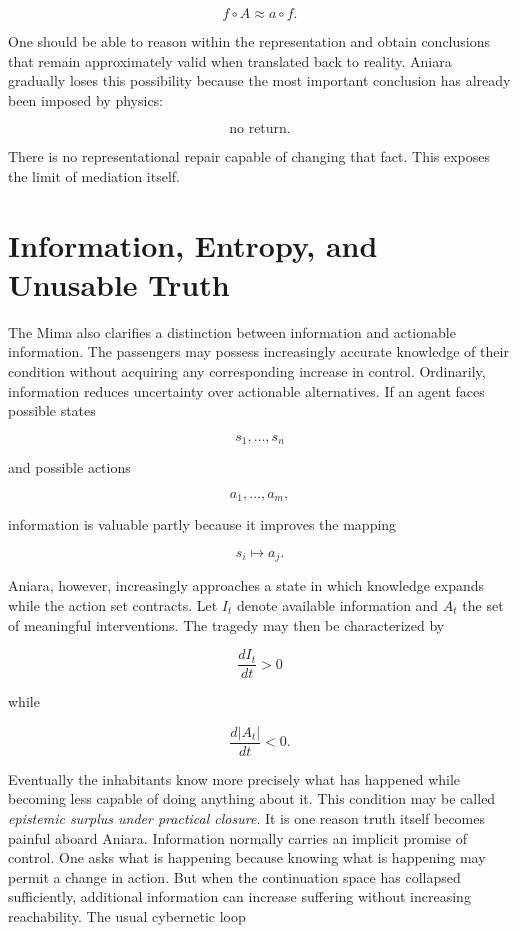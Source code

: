 \documentclass[11pt,oneside]{book}
\theoremstyle{definition}
\theoremstyle{remark}
\begin{document}
\[
f\circ A \approx a\circ f.
\]

One should be able to reason within the representation and obtain conclusions that remain
approximately valid when translated back to reality. Aniara gradually loses this possibility because
the most important conclusion has already been imposed by physics:

\[
\text{no return}.
\]

There is no representational repair capable of changing that fact. This exposes the limit of
mediation itself.

\section{Information, Entropy, and Unusable Truth}

The Mima also clarifies a distinction between information and actionable information. The passengers
may possess increasingly accurate knowledge of their condition without acquiring any corresponding
increase in control. Ordinarily, information reduces uncertainty over actionable alternatives. If an
agent faces possible states

\[
s_1,\ldots,s_n
\]

and possible actions

\[
a_1,\ldots,a_m,
\]

information is valuable partly because it improves the mapping

\[
s_i\mapsto a_j.
\]

Aniara, however, increasingly approaches a state in which knowledge expands while the action set
contracts. Let \(I_t\) denote available information and \(A_t\) the set of meaningful interventions.
The tragedy may then be characterized by

\[
\frac{dI_t}{dt}>0
\]

while

\[
\frac{d|A_t|}{dt}<0.
\]

Eventually the inhabitants know more precisely what has happened while becoming less capable of
doing anything about it. This condition may be called \emph{epistemic surplus under practical
closure}. It is one reason truth itself becomes painful aboard Aniara. Information normally carries
an implicit promise of control. One asks what is happening because knowing what is happening may
permit a change in action. But when the continuation space has collapsed sufficiently, additional
information can increase suffering without increasing reachability. The usual cybernetic loop
\end{document}
